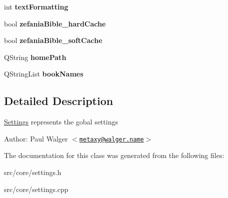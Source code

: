 \begin{CompactItemize}
\item 
\hypertarget{classSettings_8ab9cbd065e446b65f9fbb4ce6f981a7}{
int \textbf{textFormatting}}
\label{classSettings_8ab9cbd065e446b65f9fbb4ce6f981a7}

\item 
\hypertarget{classSettings_28f6c1d7cdf32e63ee846d0a837e5cb6}{
bool \textbf{zefaniaBible\_\-hardCache}}
\label{classSettings_28f6c1d7cdf32e63ee846d0a837e5cb6}

\item 
\hypertarget{classSettings_ef510dadba5c3c966cff5d5175c47e7f}{
bool \textbf{zefaniaBible\_\-softCache}}
\label{classSettings_ef510dadba5c3c966cff5d5175c47e7f}

\item 
\hypertarget{classSettings_28469cd69cee24a26821011fa375508b}{
QString \textbf{homePath}}
\label{classSettings_28469cd69cee24a26821011fa375508b}

\item 
\hypertarget{classSettings_b062343977a2a1ca8c42e48aee4b6948}{
QStringList \textbf{bookNames}}
\label{classSettings_b062343977a2a1ca8c42e48aee4b6948}

\end{CompactItemize}


\subsection{Detailed Description}
\hyperlink{classSettings}{Settings} represents the gobal settings

\begin{Desc}
\item[Author:]Paul Walger $<$\href{mailto:metaxy@walger.name}{\tt metaxy@walger.name}$>$ \end{Desc}


The documentation for this class was generated from the following files:\begin{CompactItemize}
\item 
src/core/settings.h\item 
src/core/settings.cpp\end{CompactItemize}
